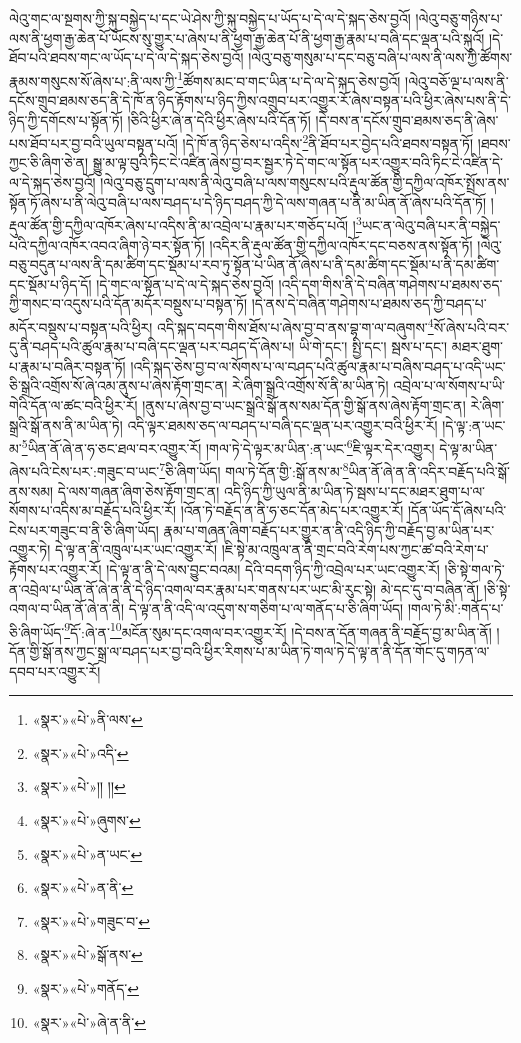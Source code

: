 ལེའུ་གང་ལ་སྔགས་ཀྱི་སྐུ་བསྐྱེད་པ་དང་ཡེ་ཤེས་ཀྱི་སྐུ་བསྐྱེད་པ་ཡོད་པ་དེ་ལ་དེ་སྐད་ཅེས་བྱའོ། །ལེའུ་བཅུ་གཉིས་པ་ལས་ནི་ཕྱག་རྒྱ་ཆེན་པོ་ཡོངས་སུ་གྱུར་པ་ཞེས་པ་ནི་ཕྱག་རྒྱ་ཆེན་པོ་ནི་ཕྱག་རྒྱ་རྣམ་པ་བཞི་དང་ལྡན་པའི་སྐུའོ། །དེ་ཐོབ་པའི་ཐབས་གང་ལ་ཡོད་པ་དེ་ལ་དེ་སྐད་ཅེས་བྱའོ། །ལེའུ་བཅུ་གསུམ་པ་དང་བཅུ་བཞི་པ་ལས་ནི་ལས་ཀྱི་ཚོགས་རྣམས་གསུངས་སོ་ཞེས་པ་:ནི་ལས་ཀྱི་\footnote{«སྣར་»«པེ་»ནི་ལས་}ཚོགས་མང་བ་གང་ཡིན་པ་དེ་ལ་དེ་སྐད་ཅེས་བྱའོ། །ལེའུ་བཅོ་ལྔ་པ་ལས་ནི་དངོས་གྲུབ་ཐམས་ཅད་ནི་དེ་ཁོ་ན་ཉིད་རྟོགས་པ་ཉིད་ཀྱིས་འགྲུབ་པར་འགྱུར་རོ་ཞེས་བསྟན་པའི་ཕྱིར་ཞེས་པས་ནི་དེ་ཉིད་ཀྱི་དགོངས་པ་སྟོན་ཏོ། །ཅིའི་ཕྱིར་ཞེ་ན་དེའི་ཕྱིར་ཞེས་པའི་དོན་ཏོ། །དེ་བས་ན་དངོས་གྲུབ་ཐམས་ཅད་ནི་ཞེས་པས་ཐོབ་པར་བྱ་བའི་ཡུལ་བསྟན་པའོ། །དེ་ཁོ་ན་ཉིད་ཅེས་པ་འདིས་\footnote{«སྣར་»«པེ་»འདི་}ནི་ཐོབ་པར་བྱེད་པའི་ཐབས་བསྟན་ཏོ། །ཐབས་ཀྱང་ཅི་ཞིག་ཅེ་ན། སྒྱུ་མ་ལྟ་བུའི་ཏིང་ངེ་འཛིན་ཞེས་བྱ་བར་སྦྱར་ཏེ་དེ་གང་ལ་སྟོན་པར་འགྱུར་བའི་ཏིང་ངེ་འཛིན་དེ་ལ་དེ་སྐད་ཅེས་བྱའོ། །ལེའུ་བཅུ་དྲུག་པ་ལས་ནི་ལེའུ་བཞི་པ་ལས་གསུངས་པའི་རྡུལ་ཚོན་གྱི་དཀྱིལ་འཁོར་སྤྲོས་ནས་སྟོན་ཏོ་ཞེས་པ་ནི་ལེའུ་བཞི་པ་ལས་བཤད་པ་དེ་ཉིད་བཤད་ཀྱི་དེ་ལས་གཞན་པ་ནི་མ་ཡིན་ནོ་ཞེས་པའི་དོན་ཏོ། །རྡུལ་ཚོན་གྱི་དཀྱིལ་འཁོར་ཞེས་པ་འདིས་ནི་མ་འབྲེལ་པ་རྣམ་པར་གཅོད་པའོ། །\footnote{«སྣར་»«པེ་»།། །།}ཡང་ན་ལེའུ་བཞི་པར་ནི་བསྐྱེད་པའི་དཀྱིལ་འཁོར་འབའ་ཞིག་ཉེ་བར་སྟོན་ཏོ། །འདིར་ནི་རྡུལ་ཚོན་གྱི་དཀྱིལ་འཁོར་དང་བཅས་ནས་སྟོན་ཏོ། །ལེའུ་བཅུ་བདུན་པ་ལས་ནི་དམ་ཚིག་དང་སྡོམ་པ་རབ་ཏུ་སྟོན་པ་ཡིན་ནོ་ཞེས་པ་ནི་དམ་ཚིག་དང་སྡོམ་པ་ནི་དམ་ཚིག་དང་སྡོམ་པ་ཉིད་དོ། །དེ་གང་ལ་སྟོན་པ་དེ་ལ་དེ་སྐད་ཅེས་བྱའོ། །འདི་དག་གིས་ནི་དེ་བཞིན་གཤེགས་པ་ཐམས་ཅད་ཀྱི་གསང་བ་འདུས་པའི་དོན་མདོར་བསྡུས་པ་བསྟན་ཏོ། །དེ་ནས་དེ་བཞིན་གཤེགས་པ་ཐམས་ཅད་ཀྱི་བཤད་པ་མདོར་བསྡུས་པ་བསྟན་པའི་ཕྱིར། འདི་སྐད་བདག་གིས་ཐོས་པ་ཞེས་བྱ་བ་ནས་བྷ་ག་ལ་བཞུགས་\footnote{«སྣར་»«པེ་»ཞུགས་}སོ་ཞེས་པའི་བར་དུ་ནི་བཤད་པའི་ཚུལ་རྣམ་པ་བཞི་དང་ལྡན་པར་བཤད་དོ་ཞེས་པ། ཡི་གེ་དང་། སྤྱི་དང་། སྦས་པ་དང་། མཐར་ཐུག་པ་རྣམ་པ་བཞིར་བསྟན་ཏོ། །འདི་སྐད་ཅེས་བྱ་བ་ལ་སོགས་པ་ལ་བཤད་པའི་ཚུལ་རྣམ་པ་བཞིས་བཤད་པ་འདི་ཡང་ཅི་སྒྲའི་འགྲོས་སོ་ཞེ་འམ་ནུས་པ་ཞེས་རྟོག་གྲང་ན། རེ་ཞིག་སྒྲའི་འགྲོས་སོ་ནི་མ་ཡིན་ཏེ། འབྲེལ་པ་ལ་སོགས་པ་ཡི་གེའི་དོན་ལ་ཚང་བའི་ཕྱིར་རོ། །ནུས་པ་ཞེས་བྱ་བ་ཡང་སྒྲའི་སྒོ་ནས་སམ་དོན་གྱི་སྒོ་ནས་ཞེས་རྟོག་གྲང་ན། རེ་ཞིག་སྒྲའི་སྒོ་ནས་ནི་མ་ཡིན་ཏེ། འདི་ལྟར་ཐམས་ཅད་ལ་བཤད་པ་བཞི་དང་ལྡན་པར་འགྱུར་བའི་ཕྱིར་རོ། །དེ་ལྟ་:ན་ཡང་མ་\footnote{«སྣར་»«པེ་»ན་ཡང་}ཡིན་ནོ་ཞེ་ན་ཧ་ཅང་ཐལ་བར་འགྱུར་རོ། །གལ་ཏེ་དེ་ལྟར་མ་ཡིན་:ན་ཡང་\footnote{«སྣར་»«པེ་»ན་ནི་}ཇི་ལྟར་དེར་འགྱུར། དེ་ལྟ་མ་ཡིན་ཞེས་པའི་ངེས་པར་:གཟུང་བ་ཡང་\footnote{«སྣར་»«པེ་»གཟུང་བ་}ཅི་ཞིག་ཡོད། གལ་ཏེ་དོན་གྱི་:སྒོ་ནས་མ་\footnote{«སྣར་»«པེ་»སྒོ་ནས་}ཡིན་ནོ་ཞེ་ན་ནི་འདིར་བརྗོད་པའི་སྒོ་ནས་སམ། དེ་ལས་གཞན་ཞིག་ཅེས་རྟོག་གྲང་ན། འདི་ཉིད་ཀྱི་ཡུལ་ནི་མ་ཡིན་ཏེ་སྦས་པ་དང་མཐར་ཐུག་པ་ལ་སོགས་པ་འདིས་མ་བརྗོད་པའི་ཕྱིར་རོ། །འོན་ཏེ་བརྗོད་ན་ནི་ཧ་ཅང་དོན་མེད་པར་འགྱུར་རོ། །དོན་ཡོད་དོ་ཞེས་པའི་ངེས་པར་གཟུང་བ་ནི་ཅི་ཞིག་ཡོད། རྣམ་པ་གཞན་ཞིག་བརྗོད་པར་གྱུར་ན་ནི་འདི་ཉིད་ཀྱི་བརྗོད་བྱ་མ་ཡིན་པར་འགྱུར་ཏེ། དེ་ལྟ་ན་ནི་འཁྲུལ་པར་ཡང་འགྱུར་རོ། །ཇི་སྟེ་མ་འཁྲུལ་ན་ནི་གྲང་བའི་རེག་པས་ཀྱང་ཚ་བའི་རེག་པ་རྟོགས་པར་འགྱུར་རོ། །དེ་ལྟ་ན་ནི་དེ་ལས་བྱུང་བའམ། དེའི་བདག་ཉིད་ཀྱི་འབྲེལ་པར་ཡང་འགྱུར་རོ། །ཅི་སྟེ་གལ་ཏེ་ན་འབྲེལ་པ་ཡིན་ནོ་ཞེ་ན་ནི་དེ་ཉིད་འགལ་བར་རྣམ་པར་གནས་པར་ཡང་མི་རུང་སྟེ། མེ་དང་དུ་བ་བཞིན་ནོ། །ཅི་སྟེ་འགལ་བ་ཡིན་ནོ་ཞེ་ན་ནི། དེ་ལྟ་ན་ནི་འདི་ལ་འདུག་ས་གཅིག་པ་ལ་གནོད་པ་ཅི་ཞིག་ཡོད། །གལ་ཏེ་མི་:གནོད་པ་ཅི་ཞིག་ཡོད་\footnote{«སྣར་»«པེ་»གནོད་}དོ་:ཞེ་ན་\footnote{«སྣར་»«པེ་»ཞེ་ན་ནི་}མངོན་སུམ་དང་འགལ་བར་འགྱུར་རོ། །དེ་བས་ན་དོན་གཞན་ནི་བརྗོད་བྱ་མ་ཡིན་ནོ། །དོན་གྱི་སྒོ་ནས་ཀྱང་སྒྲ་ལ་བཤད་པར་བྱ་བའི་ཕྱིར་རིགས་པ་མ་ཡིན་ཏེ་གལ་ཏེ་དེ་ལྟ་ན་ནི་དོན་གོང་དུ་གཏན་ལ་དབབ་པར་འགྱུར་རོ། 